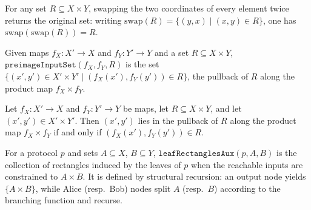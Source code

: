 \begin{theorem}
\label{CommunicationComplexity.Deterministic.Protocol.swapInputSet_swapInputSet}
\leanok
{}
For any set $R \subseteq X \times Y$, swapping the two coordinates of every element
twice returns the original set: writing $\mathrm{swap}(R) = \{(y,x) \mid (x,y) \in R\}$,
one has $\mathrm{swap}(\mathrm{swap}(R)) = R$.
\end{theorem}

\begin{definition}
\label{CommunicationComplexity.Deterministic.Protocol.preimageInputSet}
\leanok
Given maps $f_X : X' \to X$ and $f_Y : Y' \to Y$ and a set $R \subseteq X \times Y$,
$\texttt{preimageInputSet}(f_X, f_Y, R)$ is the set
$\{(x', y') \in X' \times Y' \mid (f_X(x'), f_Y(y')) \in R\}$, the pullback of $R$ along
the product map $f_X \times f_Y$.
\end{definition}

\begin{theorem}
\label{CommunicationComplexity.Deterministic.Protocol.mem_preimageInputSet}
\leanok
{}
Let $f_X : X' \to X$ and $f_Y : Y' \to Y$ be maps, let $R \subseteq X \times Y$, and let
$(x', y') \in X' \times Y'$. Then $(x', y')$ lies in the pullback of $R$ along the
product map $f_X \times f_Y$ if and only if $(f_X(x'), f_Y(y')) \in R$.
\end{theorem}

\begin{definition}
\label{CommunicationComplexity.Deterministic.Protocol.leafRectanglesAux}
\leanok
{}
For a protocol $p$ and sets $A \subseteq X$, $B \subseteq Y$, $\texttt{leafRectanglesAux}(p, A, B)$
is the collection of rectangles induced by the leaves of $p$ when the reachable inputs are
constrained to $A \times B$. It is defined by structural recursion: an output node yields
$\{A \times B\}$, while Alice (resp.\ Bob) nodes split $A$ (resp.\ $B$) according to the
branching function and recurse.
\end{definition}

